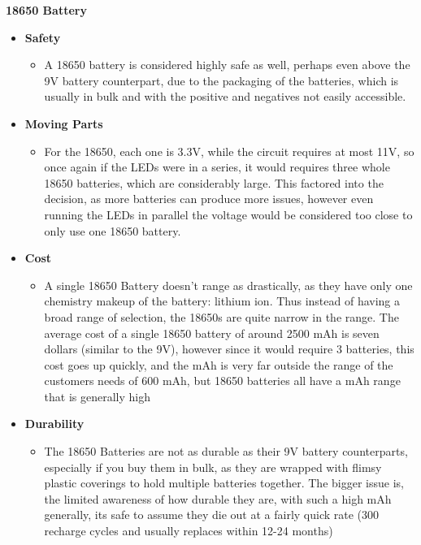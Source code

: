 \documentclass[12pt]{article}
\begin{document}
					\noindent\textbf{18650 Battery}
					{\renewcommand\labelitemi{}
						\begin{itemize}
							\item \textbf{Safety}
							\begin{itemize}
								\item A 18650 battery is considered highly safe as well, perhaps even above the 9V battery counterpart, due to the packaging of the batteries, which is usually in bulk and with the positive and negatives not easily accessible. 
							\end{itemize}
							\item \textbf{Moving Parts}
							\begin{itemize}
								\item For the 18650, each one is 3.3V, while the circuit requires at most 11V, so once again if the LEDs were in a series, it would requires three whole 18650 batteries, which are considerably large. This factored into the decision, as more batteries can produce more issues, however even running the LEDs in parallel the voltage would be considered too close to only use one 18650 battery.
							\end{itemize}
							\item \textbf{Cost}
							\begin{itemize}
								\item A single 18650 Battery doesn't range as drastically, as they have only one chemistry makeup of the battery: lithium ion. Thus instead of having a broad range of selection, the 18650s are quite narrow in the range. The average cost of a single 18650 battery of around 2500 mAh is seven dollars (similar to the 9V), however since it would require 3 batteries, this cost goes up quickly, and the mAh is very far outside the range of the customers needs of 600 mAh, but 18650 batteries all have a mAh range that is generally high
							\end{itemize}
							\item \textbf{Durability}
							\begin{itemize}
								\item The 18650 Batteries are not as durable as their 9V battery counterparts, especially if you buy them in bulk, as they are wrapped with flimsy plastic coverings to hold multiple batteries together. The bigger issue is, the limited awareness of how durable they are, with such a high mAh generally, its safe to assume they die out at a fairly quick rate (300 recharge cycles and usually replaces within 12-24 months)

\end{itemize}
\end{itemize}}
\end{document}
